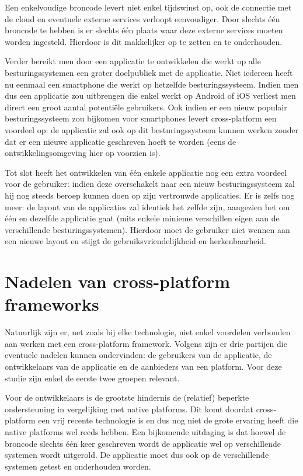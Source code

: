 Een enkelvoudige broncode levert niet enkel tijdswinst op, ook de connectie met de cloud en eventuele externe services verloopt eenvoudiger. Door slechts één broncode te hebben is er slechts één plaats waar deze externe services moeten worden ingesteld. Hierdoor is dit makkelijker op te zetten en te onderhouden.

Verder bereikt men door een applicatie te ontwikkelen die werkt op alle besturingssystemen een groter doelpubliek met de applicatie. Niet iedereen heeft nu eenmaal een smartphone die werkt op hetzelfde besturingssysteem. Indien men dus een applicatie zou uitbrengen die enkel werkt op Android of iOS verliest men direct een groot aantal potentiële gebruikers. Ook indien er een nieuw populair besturingssysteem zou bijkomen voor smartphones levert cross-platform een voordeel op: de applicatie zal ook op dit besturingssysteem kunnen werken zonder dat er een nieuwe applicatie geschreven hoeft te worden (eens de ontwikkelingsomgeving hier op voorzien is).

Tot slot heeft het ontwikkelen van één enkele applicatie nog een extra voordeel voor de gebruiker: indien deze overschakelt naar een nieuw besturingssysteem zal hij nog steeds beroep kunnen doen op zijn vertrouwde applicaties. Er is zelfs nog meer: de layout van de applicaties zal identiek het zelfde zijn, aangezien het om één en dezelfde applicatie gaat (mits enkele minieme verschillen eigen aan de verschillende besturingssystemen). Hierdoor moet de gebruiker niet wennen aan een nieuwe layout en stijgt de gebruiksvriendelijkheid en herkenbaarheid.

\section{Nadelen van cross-platform frameworks}
\label{se:nadelenCrossPlatform}

Natuurlijk zijn er, net zoals bij elke technologie, niet enkel voordelen verbonden aan werken met een cross-platform framework. Volgens \textcite{Corral2012} zijn er drie partijen die eventuele nadelen kunnen ondervinden: de gebruikers van de applicatie, de ontwikkelaars van de applicatie en de aanbieders van een platform. Voor deze studie zijn enkel de eerste twee groepen relevant.

Voor de ontwikkelaars is de grootste hindernis de (relatief) beperkte ondersteuning in vergelijking met native platforms. Dit komt doordat cross-platform een vrij recente technologie is en dus nog niet de grote ervaring heeft die native platforms wel reeds hebben. Een bijkomende uitdaging is dat hoewel de broncode slechts één keer geschreven wordt de applicatie wel op verschillende systemen wordt uitgerold. De applicatie moet dus ook op de verschillende systemen getest en onderhouden worden.

